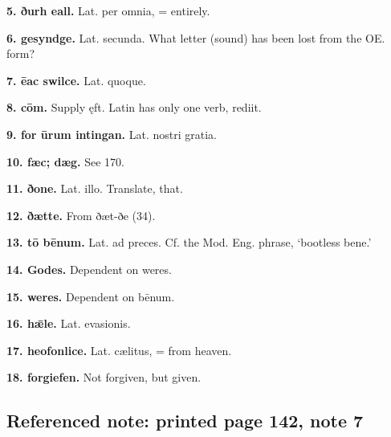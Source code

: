 \textbf{5. ðurh eall.} Lat. per omnia, = entirely.

\textbf{6. gesyndge.} Lat. secunda. What letter (sound) has been lost from the OE. form?

\textbf{7. ēac swilce.} Lat. quoque.

\textbf{8. cōm.} Supply ęft. Latin has only one verb, rediit.

\textbf{9. for ūrum intingan.} Lat. nostri gratia.

\textbf{10. fæc; dæg.} See 170.

\textbf{11. ðone.} Lat. illo. Translate, that.

\textbf{12. ðætte.} From ðæt-ðe (34).

\textbf{13. tō bēnum.} Lat. ad preces. Cf. the Mod. Eng. phrase, ‘bootless bene.’

\textbf{14. Godes.} Dependent on weres.

\textbf{15. weres.} Dependent on bēnum.

\textbf{16. hǣle.} Lat. evasionis.

\textbf{17. heofonlice.} Lat. cælitus, = from heaven.

\textbf{18. forgiefen.} Not forgiven, but given.

\subsection*{Referenced note: printed page 142, note 7}

